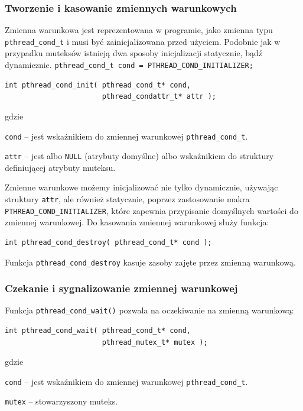 \subsubsection{Tworzenie i kasowanie zmiennych warunkowych}

Zmienna warunkowa jest reprezentowana w programie, jako zmienna typu \lstinline[style=MyCStyle]{pthread_cond_t} i musi być zainicjalizowana przed użyciem. Podobnie jak w przypadku muteksów istnieją dwa sposoby inicjalizacji statycznie, bądź dynamicznie.
\lstinline[style=MyCStyle]{pthread_cond_t cond = PTHREAD_COND_INITIALIZER;}

\begin{lstlisting}[style=MyCStyle]
int pthread_cond_init( pthread_cond_t* cond,
                       pthread_condattr_t* attr );
\end{lstlisting}
gdzie
\begin{myitemize}
\item \lstinline[style=MyCStyle]{cond} -- jest wskaźnikiem do zmiennej warunkowej \lstinline[style=MyCStyle]{pthread_cond_t}.
\item \lstinline[style=MyCStyle]{attr} -- jest albo \lstinline[style=MyCStyle]{NULL} (atrybuty domyślne) albo wskaźnikiem do struktury definiującej atrybuty muteksu.
\end{myitemize}


Zmienne warunkowe możemy inicjalizować nie tylko dynamicznie, używając struktury \lstinline[style=MyCStyle]{attr}, ale również  statycznie, poprzez zastosowanie makra \lstinline[style=MyCStyle]{PTHREAD_COND_INITIALIZER}, które zapewnia przypisanie domyślnych wartości do zmiennej warunkowej. Do kasowania zmiennej warunkowej służy funkcja:


\begin{lstlisting}[style=MyCStyle]
int pthread_cond_destroy( pthread_cond_t* cond );
\end{lstlisting}

Funkcja \lstinline[style=MyCStyle]{pthread_cond_destroy} kasuje zasoby zajęte przez zmienną warunkową.

\subsubsection{Czekanie i sygnalizowanie zmiennej warunkowej}

Funkcja \lstinline[style=MyCStyle]{pthread_cond_wait()} pozwala na oczekiwanie na zmienną warunkową:

\begin{lstlisting}[style=MyCStyle]
int pthread_cond_wait( pthread_cond_t* cond,
                       pthread_mutex_t* mutex );
\end{lstlisting}
gdzie
\begin{myitemize}
\item \lstinline[style=MyCStyle]{cond} -- jest wskaźnikiem do zmiennej warunkowej \lstinline[style=MyCStyle]{pthread_cond_t}.
\item \lstinline[style=MyCStyle]{mutex} -- stowarzyszony muteks.
\end{myitemize}

